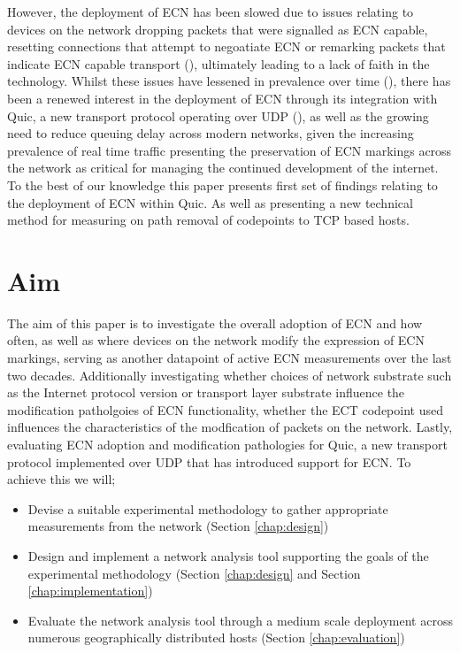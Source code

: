 \documentclass{l4proj}
\begin{document}
However, the deployment of ECN has been slowed due to issues relating to devices on the network dropping packets that were signalled as ECN capable, resetting connections that attempt to negoatiate ECN or remarking packets that indicate ECN capable transport (\cite{floyd_inappropriate_2002}), ultimately leading to a lack of faith in the technology. Whilst these issues have lessened in prevalence over time (\cite{trammell_enabling_2015}), there has been a renewed interest in the deployment of ECN through its integration with Quic, a new transport protocol operating over UDP (\cite{johansson_ecn_2017}), as well as the growing need to reduce queuing delay across modern networks, given the increasing prevalence of real time traffic presenting the preservation of ECN markings across the network as critical for managing the continued development of the internet. To the best of our knowledge this paper presents first set of findings relating to the deployment of ECN within Quic. As well as presenting a new technical method for measuring on path removal of codepoints to TCP based hosts.

\section{Aim}

The aim of this paper is to investigate the overall adoption of ECN and how often, as well as where devices on the network modify the expression of ECN markings, serving as another datapoint of active ECN measurements over the last two decades. Additionally investigating whether choices of network substrate such as the Internet protocol version or transport layer substrate influence the modification patholgoies of ECN functionality, whether the ECT codepoint used influences the characteristics of the modfication of packets on the network. Lastly, evaluating ECN adoption and modification pathologies for Quic, a  new transport protocol implemented over UDP that has introduced support for ECN. To achieve this we will;
\begin{itemize}
    \item Devise a suitable experimental methodology to gather appropriate measurements from the network (Section \ref{chap:design})
    \item Design and implement a network analysis tool supporting the goals of the experimental methodology (Section \ref{chap:design} and Section \ref{chap:implementation})
    \item Evaluate the network analysis tool through a medium scale deployment across numerous geographically distributed hosts (Section \ref{chap:evaluation})
\end{itemize}
\end{document}
